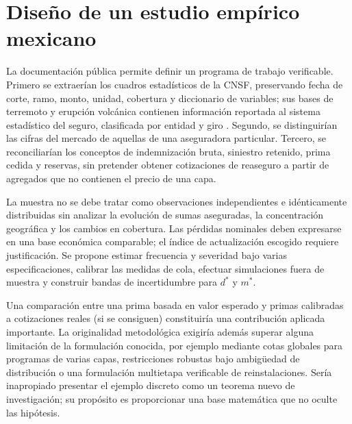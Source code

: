 \documentclass[11pt,reqno]{amsart}
\theoremstyle{definition}\newtheorem{definition}[theorem]{Definición}
\theoremstyle{remark}\newtheorem{remark}[theorem]{Observación}
\begin{document}
\section{Diseño de un estudio empírico mexicano}
La documentación pública permite definir un programa de trabajo verificable. Primero se extraerían los cuadros estadísticos de la CNSF, preservando fecha de corte, ramo, monto, unidad, cobertura y diccionario de variables; sus bases de terremoto y erupción volcánica contienen información reportada al sistema estadístico del seguro, clasificada por entidad y giro \cite{CNSFTerremoto,CNSFDatos}. Segundo, se distinguirían las cifras del mercado de aquellas de una aseguradora particular. Tercero, se reconciliarían los conceptos de indemnización bruta, siniestro retenido, prima cedida y reservas, sin pretender obtener cotizaciones de reaseguro a partir de agregados que no contienen el precio de una capa.

La muestra no se debe tratar como observaciones independientes e idénticamente distribuidas sin analizar la evolución de sumas aseguradas, la concentración geográfica y los cambios en cobertura. Las pérdidas nominales deben expresarse en una base económica comparable; el índice de actualización escogido requiere justificación. Se propone estimar frecuencia y severidad bajo varias especificaciones, calibrar las medidas de cola, efectuar simulaciones fuera de muestra y construir bandas de incertidumbre para $d^*$ y $m^*$.

Una comparación entre una prima basada en valor esperado y primas calibradas a cotizaciones reales (si se consiguen) constituiría una contribución aplicada importante. La originalidad metodológica exigiría además superar alguna limitación de la formulación conocida, por ejemplo mediante cotas globales para programas de varias capas, restricciones robustas bajo ambigüedad de distribución o una formulación multietapa verificable de reinstalaciones. Sería inapropiado presentar el ejemplo discreto como un teorema nuevo de investigación; su propósito es proporcionar una base matemática que no oculte las hipótesis.
\end{document}
